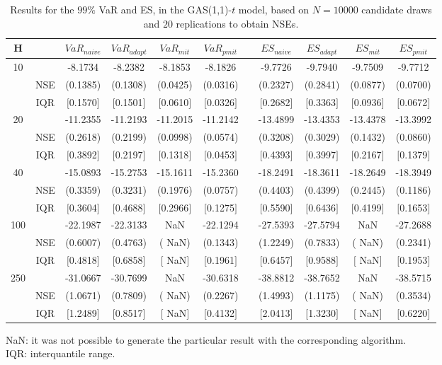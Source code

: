 \footnotesize{  
{ \renewcommand{\arraystretch}{1.3} 
\begin{table}[h] 
\centering 
\caption{Results for the $99\%$ VaR and ES, in the GAS(1,1)-$t$ model, based on $N=10000$ candidate draws and $20$ replications to obtain NSEs.} 
\label{tab:res_algos_t_gas} 
\begin{tabular}{ccccccccccc}  
 H & & $VaR_{naive}$ & $VaR_{adapt}$ & $VaR_{mit}$  & $VaR_{pmit}$ &  & $ES_{naive}$ & $ES_{adapt}$ & $ES_{mit}$ & $ES_{pmit}$ \\ \hline 
10 & & -8.1734 & -8.2382 & -8.1853 & -8.1826 & & -9.7726 & -9.7940 & -9.7509 & -9.7712  \\ 
  & NSE & (0.1385) & (0.1308) & (0.0425) & (0.0316) & & (0.2327) & (0.2841) & (0.0877) & (0.0700)   \\ 
 & IQR & $[$0.1570$]$ & $[$0.1501$]$ & $[$0.0610$]$ & $[$0.0326$]$ & & $[$0.2682$]$ & $[$0.3363$]$ & $[$0.0936$]$ & $[$0.0672$]$  \\ [1ex] 
20 & & -11.2355 & -11.2193 & -11.2015 & -11.2142 & & -13.4899 & -13.4353 & -13.4378 & -13.3992  \\ 
  & NSE & (0.2618) & (0.2199) & (0.0998) & (0.0574) & & (0.3208) & (0.3029) & (0.1432) & (0.0860)   \\ 
 & IQR & $[$0.3892$]$ & $[$0.2197$]$ & $[$0.1318$]$ & $[$0.0453$]$ & & $[$0.4393$]$ & $[$0.3997$]$ & $[$0.2167$]$ & $[$0.1379$]$  \\ [1ex] 
40 & & -15.0893 & -15.2753 & -15.1611 & -15.2360 & & -18.2491 & -18.3611 & -18.2649 & -18.3949  \\ 
  & NSE & (0.3359) & (0.3231) & (0.1976) & (0.0757) & & (0.4403) & (0.4399) & (0.2445) & (0.1186)   \\ 
 & IQR & $[$0.3604$]$ & $[$0.4688$]$ & $[$0.2966$]$ & $[$0.1275$]$ & & $[$0.5590$]$ & $[$0.6436$]$ & $[$0.4199$]$ & $[$0.1653$]$  \\ [1ex] 
100 & & -22.1987 & -22.3133 &    NaN & -22.1294 & & -27.5393 & -27.5794 &    NaN & -27.2688  \\ 
  & NSE & (0.6007) & (0.4763) & (   NaN) & (0.1343) & & (1.2249) & (0.7833) & (   NaN) & (0.2341)   \\ 
 & IQR & $[$0.4818$]$ & $[$0.6858$]$ & $[$   NaN$]$ & $[$0.1961$]$ & & $[$0.6457$]$ & $[$0.9588$]$ & $[$   NaN$]$ & $[$0.1953$]$  \\ [1ex] 
250 & & -31.0667 & -30.7699 &    NaN & -30.6318 & & -38.8812 & -38.7652 &    NaN & -38.5715  \\ 
  & NSE & (1.0671) & (0.7809) & (   NaN) & (0.2267) & & (1.4993) & (1.1175) & (   NaN) & (0.3534)   \\ 
 & IQR & $[$1.2489$]$ & $[$0.8517$]$ & $[$   NaN$]$ & $[$0.4132$]$ & & $[$2.0413$]$ & $[$1.3230$]$ & $[$   NaN$]$ & $[$0.6220$]$  \\ [1ex] 
\hline 
\end{tabular} 
\raggedright 

\vspace{5pt}\footnotesize{NaN: it was not possible to generate the particular result with the corresponding algorithm.} \\ 
\vspace{5pt}\footnotesize{IQR: interquantile range.} 
\end{table} 
} 
} 
